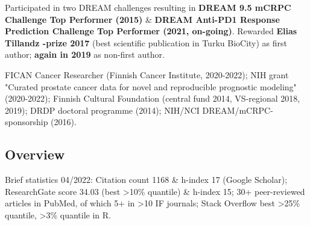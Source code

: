 \documentclass[letterpaper]{twentysecondcv} %
\begin{document}
\vspace*{-0.2cm}
Participated in two DREAM challenges resulting in \textbf{DREAM 9.5 mCRPC Challenge Top Performer (2015)} \& \textbf{DREAM Anti-PD1 Response Prediction Challenge Top Performer (2021, on-going)}. Rewarded \textbf{Elias Tillandz -prize 2017} (best scientific publication in Turku BioCity) as first author; \textbf{again in 2019} as non-first author.



\vspace*{-0.1cm}
FICAN Cancer Researcher (Finnish Cancer Institute, 2020-2022); NIH grant "Curated prostate cancer data for novel and reproducible prognostic modeling" (2020-2022); Finnish Cultural Foundation (central fund 2014, VS-regional 2018, 2019); DRDP doctoral programme (2014); NIH/NCI DREAM/mCRPC-sponsorship (2016).

\subsection{Overview}

\vspace*{-0.2cm}
Brief statistics 04/2022: Citation count 1168 \& h-index 17 (Google Scholar); ResearchGate score 34.03 (best >10\% quantile) \& h-index 15; 30+ peer-reviewed articles in PubMed, of which 5+ in >10 IF journals; Stack Overflow best >25\% quantile, >3\% quantile in R.

\end{document}
